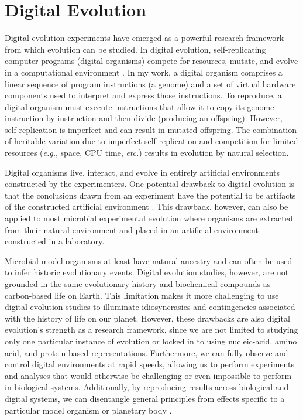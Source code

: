 \section{Digital Evolution}
\label{chapter:introduction:sec:digital-evolution}

Digital evolution experiments have emerged as a powerful research framework from which evolution can be studied.
In digital evolution, self-replicating computer programs (digital organisms) compete for resources, mutate, and evolve in a computational environment \citep{wilke_biology_2002}.
In my work, a digital organism comprises a linear sequence of program instructions (a genome) and a set of virtual hardware components used to interpret and express those instructions. 
To reproduce, a digital organism must execute instructions that allow it to copy its genome instruction-by-instruction and then divide (producing an offspring).
However, self-replication is imperfect and can result in mutated offspring.
The combination of heritable variation due to imperfect self-replication and competition for limited resources (\textit{e.g.}, space, CPU time, \textit{etc.}) results in evolution by natural selection.

Digital organisms live, interact, and evolve in entirely artificial environments constructed by the experimenters.
One potential drawback to digital evolution is that the conclusions drawn from an experiment have the potential to be artifacts of the constructed artificial environment \citep{wilke_biology_2002}.
This drawback, however, can also be applied to most microbial experimental evolution where organisms are extracted from their natural environment and placed in an artificial environment constructed in a laboratory.

Microbial model organisms at least have natural ancestry and can often be used to infer historic evolutionary events.
Digital evolution studies, however, are not grounded in the same evolutionary history and biochemical compounds as carbon-based life on Earth.
This limitation makes it more challenging to use digital evolution studies to illuminate idiosyncrasies and contingencies associated with the history of life on our planet. 
However, these drawbacks are also digital evolution's strength as a research framework, since we are not limited to studying only one particular instance of evolution or locked in to using nucleic-acid, amino acid, and protein based representations.
Furthermore, we can fully observe and control digital environments at rapid speeds, allowing us to perform experiments and analyses that would otherwise be challenging or even impossible to perform in biological systems.
Additionally, by reproducing results across biological and digital systems, we can disentangle general principles from effects specific to a particular model organism or planetary body \citep{wilke_biology_2002}.

